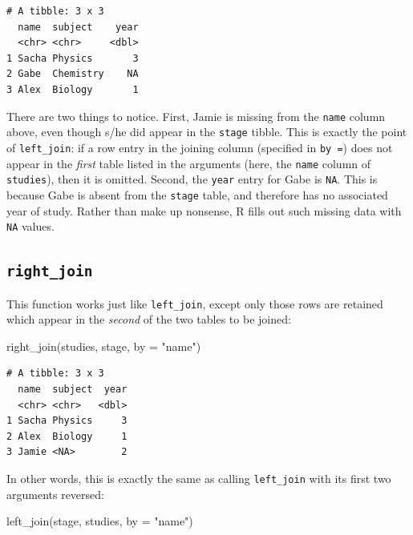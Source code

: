 \documentclass[
  letterpaper,
  DIV=11,
  numbers=noendperiod]{scrreprt}
\newenvironment{Shaded}{\begin{snugshade}}{\end{snugshade}}
\newcommand{\AttributeTok}[1]{\textcolor[rgb]{0.40,0.45,0.13}{#1}}
\newcommand{\FunctionTok}[1]{\textcolor[rgb]{0.28,0.35,0.67}{#1}}
\newcommand{\NormalTok}[1]{\textcolor[rgb]{0.00,0.23,0.31}{#1}}
\newcommand{\StringTok}[1]{\textcolor[rgb]{0.13,0.47,0.30}{#1}}
\begin{document}
\begin{verbatim}
# A tibble: 3 x 3
  name  subject    year
  <chr> <chr>     <dbl>
1 Sacha Physics       3
2 Gabe  Chemistry    NA
3 Alex  Biology       1
\end{verbatim}

There are two things to notice. First, Jamie is missing from the
\texttt{name} column above, even though s/he did appear in the
\texttt{stage} tibble. This is exactly the point of \texttt{left\_join}:
if a row entry in the joining column (specified in \texttt{by\ =}) does
not appear in the \emph{first} table listed in the arguments (here, the
\texttt{name} column of \texttt{studies}), then it is omitted. Second,
the \texttt{year} entry for Gabe is \texttt{NA}. This is because Gabe is
absent from the \texttt{stage} table, and therefore has no associated
year of study. Rather than make up nonsense, R fills out such missing
data with \texttt{NA} values.

\hypertarget{right_join}{%
\subsection{\texorpdfstring{\texttt{right\_join}}{right\_join}}\label{right_join}}

This function works just like \texttt{left\_join}, except only those
rows are retained which appear in the \emph{second} of the two tables to
be joined:

\begin{Shaded}
\begin{Highlighting}[]
\FunctionTok{right\_join}\NormalTok{(studies, stage, }\AttributeTok{by =} \StringTok{"name"}\NormalTok{)}
\end{Highlighting}
\end{Shaded}

\begin{verbatim}
# A tibble: 3 x 3
  name  subject  year
  <chr> <chr>   <dbl>
1 Sacha Physics     3
2 Alex  Biology     1
3 Jamie <NA>        2
\end{verbatim}

In other words, this is exactly the same as calling \texttt{left\_join}
with its first two arguments reversed:

\begin{Shaded}
\begin{Highlighting}[]
\FunctionTok{left\_join}\NormalTok{(stage, studies, }\AttributeTok{by =} \StringTok{"name"}\NormalTok{)}
\end{Highlighting}
\end{Shaded}
\end{document}
